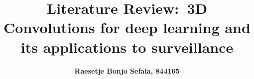 
\topmargin=-0.45in

\evensidemargin=0in

\oddsidemargin=0in

\textwidth=6.5in

\textheight=9.0in

\headsep=0.25in

 

\linespread{1.1} %


\pagestyle{fancy}
\lhead{\hmwkAuthorName} %
\cfoot{} %
\renewcommand\headrulewidth{0.4pt} %
\renewcommand\footrulewidth{0.4pt} %
\setlength\parindent{0pt} %

 

 

 




 

\newcommand{\hmwkTitle}{3D Convolutions for deep learning and its applications to surveillance} %
\newcommand{\hmwkDueDate}{Tuesday,\ March\ 22,\ 2017} %
\newcommand{\hmwkClass}{Literature Review} %
\newcommand{\hmwkAuthorName}{Raesetje Bonjo Sefala, 844165} %

 




 

\title{
\vspace{2in}
\textmd{\textbf{\hmwkClass:\ \hmwkTitle}}\\
\vspace{3in}
}
\author{\textbf{\hmwkAuthorName}}


